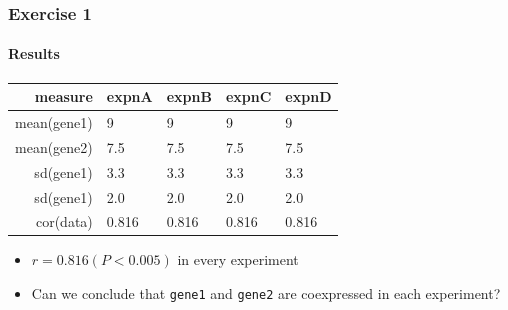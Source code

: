 \documentclass[table]{beamer}
\begin{document}
  \begin{frame}
    \frametitle{Exercise 1}
    \framesubtitle{Results}
    \begin{center}
	\begin{tabular}{r|l|l|l|l}
	  measure & expnA & expnB & expnC & expnD \\
	  \hline
	  mean(gene1) & 9     & 9     & 9     & 9 \\
	  mean(gene2) & 7.5   & 7.5   & 7.5   & 7.5 \\
  	  sd(gene1)   & 3.3   & 3.3   & 3.3   & 3.3 \\
  	  sd(gene1)   & 2.0   & 2.0   & 2.0   & 2.0 \\  
	  cor(data)   & 0.816 & 0.816 & 0.816 & 0.816 \\  
	\end{tabular}
	\end{center}
	\begin{itemize}
      \item<2-> $r=0.816 (P<0.005)$ in every experiment
      \item Can we conclude that \texttt{gene1} and \texttt{gene2} are coexpressed in each experiment?
    \end{itemize}
  \end{frame}
\end{document}
